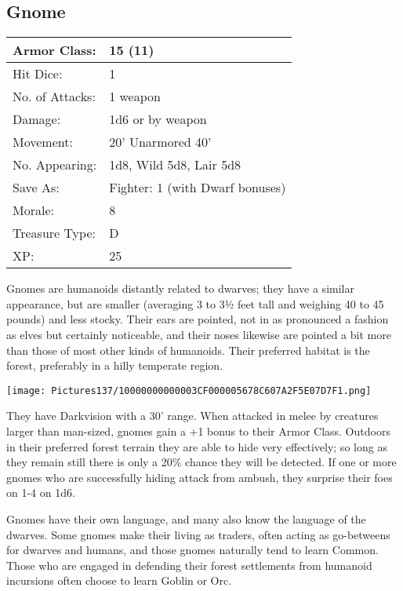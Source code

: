 \documentclass[a4paper,twoside,openany,10pt]{book}
\begin{document}
\begin{multicols}{2}
\subsection*{Gnome}\label{gnome}

\begin{tabularx}{0.48\textwidth}{@{}lX@{}}
Armor Class: & 15 (11) \\\hline
Hit Dice: & 1 \\\hline
No. of Attacks: & 1 weapon \\\hline
Damage: & 1d6 or by weapon \\\hline
Movement: & 20' Unarmored 40' \\\hline
No. Appearing: & 1d8, Wild 5d8, Lair 5d8 \\\hline
Save As: & Fighter: 1 (with Dwarf bonuses) \\\hline
Morale: & 8 \\\hline
Treasure Type: & D \\\hline
XP: & 25 \\\hline
\end{tabularx}\medskip

Gnomes are humanoids distantly related to dwarves; they have a similar appearance, but are smaller (averaging 3 to 3½ feet tall and weighing 40 to 45 pounds) and less stocky. Their ears are pointed, not in as pronounced a fashion as elves but certainly noticeable, and their noses likewise are pointed a bit more than those of most other kinds of humanoids. Their preferred habitat is the forest, preferably in a hilly temperate region.


\begin{center}
	\texttt{[image: Pictures137/10000000000003CF000005678C607A2F5E07D7F1.png]}
\end{center}

They have Darkvision with a 30' range. When attacked in melee by creatures larger than man-sized, gnomes gain a +1 bonus to their Armor Class. Outdoors in their preferred forest terrain they are able to hide very effectively; so long as they remain still there is only a 20\% chance they will be detected. If one or more gnomes who are successfully hiding attack from ambush, they surprise their foes on 1-4 on 1d6.

Gnomes have their own language, and many also know the language of the dwarves. Some gnomes make their living as traders, often acting as go-betweens for dwarves and humans, and those gnomes naturally tend to learn Common. Those who are engaged in defending their forest settlements from humanoid incursions often choose to learn Goblin or Orc.


\end{multicols}
\end{document}
